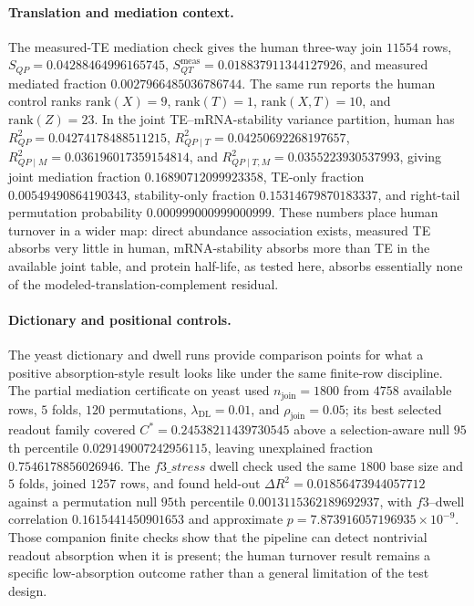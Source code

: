 \paragraph{Translation and mediation context.}
The measured-TE mediation check gives the human three-way join $11554$ rows, $S_{QP}=0.04288464996165745$, $S_{QT}^{\mathrm{meas}}=0.018837911344127926$, and measured mediated fraction $0.0027966485036786744$.  The same run reports the human control ranks $\mathrm{rank}(X)=9$, $\mathrm{rank}(T)=1$, $\mathrm{rank}(X,T)=10$, and $\mathrm{rank}(Z)=23$.  In the joint TE--mRNA-stability variance partition, human has $R^2_{QP}=0.04274178488511215$, $R^2_{QP\mid T}=0.04250692268197657$, $R^2_{QP\mid M}=0.036196017359154814$, and $R^2_{QP\mid T,M}=0.0355223930537993$, giving joint mediation fraction $0.16890712099923358$, TE-only fraction $0.00549490864190343$, stability-only fraction $0.15314679870183337$, and right-tail permutation probability $0.000999000999000999$.  These numbers place human turnover in a wider map: direct abundance association exists, measured TE absorbs very little in human, mRNA-stability absorbs more than TE in the available joint table, and protein half-life, as tested here, absorbs essentially none of the modeled-translation-complement residual.

\paragraph{Dictionary and positional controls.}
The yeast dictionary and dwell runs provide comparison points for what a positive absorption-style result looks like under the same finite-row discipline.  The partial mediation certificate on yeast used $n_{\mathrm{join}}=1800$ from $4758$ available rows, $5$ folds, $120$ permutations, $\lambda_{\mathrm{DL}}=0.01$, and $\rho_{\mathrm{join}}=0.05$; its best selected readout family covered $C^{\ast}=0.24538211439730545$ above a selection-aware null $95$th percentile $0.029149007242956115$, leaving unexplained fraction $0.7546178856026946$.  The $f3\_stress$ dwell check used the same $1800$ base size and $5$ folds, joined $1257$ rows, and found held-out $\Delta R^2=0.01856473944057712$ against a permutation null $95$th percentile $0.0013115362189692937$, with $f3$--dwell correlation $0.1615441450901653$ and approximate $p=7.873916057196935\times 10^{-9}$.  Those companion finite checks show that the pipeline can detect nontrivial readout absorption when it is present; the human turnover result remains a specific low-absorption outcome rather than a general limitation of the test design.

